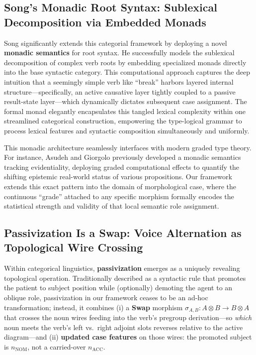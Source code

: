 \documentclass[
]{article}
\begin{document}
\subsection{Song's Monadic Root Syntax: Sublexical Decomposition via
Embedded
Monads}\label{songs-monadic-root-syntax-sublexical-decomposition-via-embedded-monads}

Song \citetext{\citeyear{song2022act}; \citeyear{song2022blog}}
significantly extends this categorial framework by deploying a novel
\textbf{monadic semantics} for root syntax. He successfully models the
sublexical decomposition of complex verb roots by embedding specialized
monads directly into the base syntactic category. This computational
approach captures the deep intuition that a seemingly simple verb like
``break'' harbors layered internal structure---specifically, an active
causative layer tightly coupled to a passive result-state layer---which
dynamically dictates subsequent case assignment. The formal monad
elegantly encapsulates this tangled lexical complexity within one
streamlined categorical construction, empowering the type-logical
grammar to process lexical features and syntactic composition
simultaneously and uniformly.

This monadic architecture seamlessly interfaces with modern graded type
theory. For instance, Asudeh and Giorgolo \citeyearpar{asudeh2020graded}
previously developed a monadic semantics tracking evidentiality,
deploying graded computational effects to quantify the shifting
epistemic real-world status of various propositions. Our framework
extends this exact pattern into the domain of morphological case, where
the continuous ``grade'' attached to any specific morphism formally
encodes the statistical strength and validity of that local semantic
role assignment.

\subsection{Passivization Is a Swap: Voice Alternation as Topological
Wire
Crossing}\label{passivization-is-a-swap-voice-alternation-as-topological-wire-crossing}

Within categorical linguistics, \textbf{passivization} emerges as a
uniquely revealing topological operation. Traditionally described as a
syntactic rule that promotes the patient to subject position while
(optionally) demoting the agent to an oblique role, passivization in our
framework ceases to be an ad-hoc transformation; instead, it combines
(i) a \textbf{Swap} morphism
\(\sigma_{A,B}: A \otimes B \to B \otimes A\) that crosses the noun
wires feeding into the verb's pregroup derivation---so \emph{which} noun
meets the verb's left vs.~right adjoint slots reverses relative to the
active diagram---and (ii) \textbf{updated case features} on those wires:
the promoted subject is \(n_{\text{NOM}}\), not a carried-over
\(n_{\text{ACC}}\).
\end{document}
